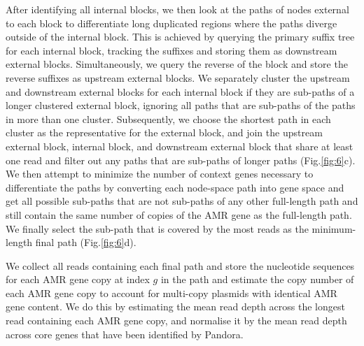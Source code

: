 After identifying all internal blocks, we then look at the paths of nodes external to each block to differentiate long duplicated regions where the paths diverge outside of the internal block. This is achieved by querying the primary suffix tree for each internal block, tracking the suffixes and storing them as downstream external blocks. Simultaneously, we query the reverse of the block and store the reverse suffixes as upstream external blocks. We separately cluster the upstream and downstream external blocks for each internal block if they are sub-paths of a longer clustered external block, ignoring all paths that are sub-paths of the paths in more than one cluster. Subsequently, we choose the shortest path in each cluster as the representative for the external block, and join the upstream external block, internal block, and downstream external block that share at least one read and filter out any paths that are sub-paths of longer paths (Fig.\ref{fig:6}c). We then attempt to minimize the number of context genes necessary to differentiate the paths by converting each node-space path into gene space and get all possible sub-paths that are not sub-paths of any other full-length path and still contain the same number of copies of the AMR gene as the full-length path. We finally select the sub-path that is covered by the most reads as the minimum-length final path (Fig.\ref{fig:6}d). 

We collect all reads containing each final path and store the nucleotide sequences for each AMR gene copy at index $g$ in the path and estimate the copy number of each AMR gene copy to account for multi-copy plasmids with identical AMR gene content. We do this by estimating the mean read depth across the longest read containing each AMR gene copy, and normalise it by the mean read depth across core genes that have been identified by Pandora.

